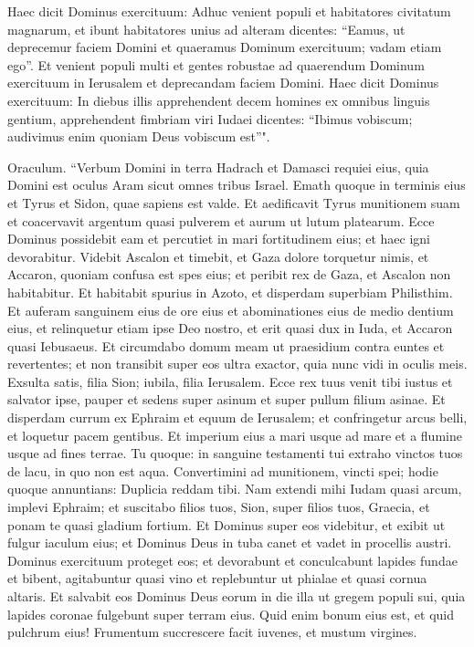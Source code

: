 \begin{biblechapter}
\verse Haec dicit Dominus exercituum: Adhuc venient populi et habitatores civitatum magnarum, 
\verse et ibunt habitatores unius ad alteram dicentes: “Eamus, ut deprecemur faciem Domini et quaeramus Dominum exercituum; vadam etiam ego”. 
\verse Et venient populi multi et gentes robustae ad quaerendum Dominum exercituum in Ierusalem et deprecandam faciem Domini. 
\verse Haec dicit Dominus exercituum: In diebus illis apprehendent decem homines ex omnibus linguis gentium, apprehendent fimbriam viri Iudaei dicentes: “Ibimus vobiscum; audivimus enim quoniam Deus vobiscum est”". 
\end{biblechapter}

\begin{biblechapter}  
\verse Oraculum. “Verbum Domini in terra Hadrach et Damasci requiei eius, quia Domini est oculus Aram sicut omnes tribus Israel. 
\verse Emath quoque in terminis eius et Tyrus et Sidon, quae sapiens est valde. 
\verse Et aedificavit Tyrus munitionem suam et coacervavit argentum quasi pulverem et aurum ut lutum platearum. 
\verse Ecce Dominus possidebit eam et percutiet in mari fortitudinem eius; et haec igni devorabitur. 
\verse Videbit Ascalon et timebit, et Gaza dolore torquetur nimis, et Accaron, quoniam confusa est spes eius; et peribit rex de Gaza, et Ascalon non habitabitur. 
\verse Et habitabit spurius in Azoto, et disperdam superbiam Philisthim. 
\verse Et auferam sanguinem eius de ore eius et abominationes eius de medio dentium eius, et relinquetur etiam ipse Deo nostro, et erit quasi dux in Iuda, et Accaron quasi Iebusaeus. 
\verse Et circumdabo domum meam ut praesidium contra euntes et revertentes; et non transibit super eos ultra exactor, quia nunc vidi in oculis meis. 
\verse Exsulta satis, filia Sion; iubila, filia Ierusalem. Ecce rex tuus venit tibi iustus et salvator ipse, pauper et sedens super asinum et super pullum filium asinae. 
\verse Et disperdam currum ex Ephraim et equum de Ierusalem; et confringetur arcus belli, et loquetur pacem gentibus. Et imperium eius a mari usque ad mare et a flumine usque ad fines terrae. 
\verse Tu quoque: in sanguine testamenti tui extraho vinctos tuos de lacu, in quo non est aqua. 
\verse Convertimini ad munitionem, vincti spei; hodie quoque annuntians: Duplicia reddam tibi. 
\verse Nam extendi mihi Iudam quasi arcum, implevi Ephraim; et suscitabo filios tuos, Sion, super filios tuos, Graecia, et ponam te quasi gladium fortium. 
\verse Et Dominus super eos videbitur, et exibit ut fulgur iaculum eius; et Dominus Deus in tuba canet et vadet in procellis austri. 
\verse Dominus exercituum proteget eos; et devorabunt et conculcabunt lapides fundae et bibent, agitabuntur quasi vino et replebuntur ut phialae et quasi cornua altaris. 
\verse Et salvabit eos Dominus Deus eorum in die illa ut gregem populi sui, quia lapides coronae fulgebunt super terram eius. 
\verse Quid enim bonum eius est, et quid pulchrum eius! Frumentum succrescere facit iuvenes, et mustum virgines. 
\end{biblechapter}


